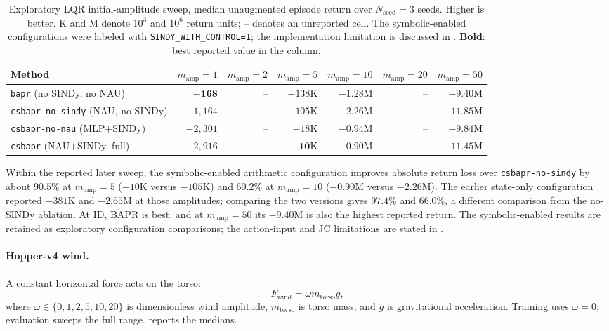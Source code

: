 \documentclass[10pt]{article}
\begin{document}
\begin{table}[htbp]
\centering
\scriptsize
\caption{Exploratory LQR initial-amplitude sweep, median unaugmented episode return over $N_{\mathrm{seed}}=3$ seeds. Higher is better. K and M denote $10^3$ and $10^6$ return units; -- denotes an unreported cell. The symbolic-enabled configurations were labeled with \texttt{SINDY\_WITH\_CONTROL=1}; the implementation limitation is discussed in . \textbf{Bold}: best reported value in the column.}
\label{tab:lqr}
\begin{tabular}{lrrrrrr}
\toprule
Method & $m_{\mathrm{amp}}{=}1$ & $m_{\mathrm{amp}}{=}2$ & $m_{\mathrm{amp}}{=}5$ & $m_{\mathrm{amp}}{=}10$ & $m_{\mathrm{amp}}{=}20$ & $m_{\mathrm{amp}}{=}50$ \\
\midrule
\texttt{bapr} (no SINDy, no NAU)         & $\mathbf{-168}$  & --      & $-138$K & $-1.28$M & --      & $\mathbf{-9.40}$M \\
\texttt{csbapr-no-sindy} (NAU, no SINDy) & $-1{,}164$  & --      & $-105$K & $-2.26$M & --      & $-11.85$M \\
\texttt{csbapr-no-nau} (MLP$+$SINDy)     & $-2{,}301$  & --      & $-18$K  & $-0.94$M & --      & $-9.84$M \\
\texttt{csbapr} (NAU$+$SINDy, full)      & $-2{,}916$  & --      & $\mathbf{-10}$K  & $\mathbf{-0.90}$M & --      & $-11.45$M \\
\bottomrule
\end{tabular}
\end{table}

Within the reported later sweep, the symbolic-enabled arithmetic configuration improves absolute return loss over \texttt{csbapr-no-sindy} by about $90.5\%$ at $m_{\mathrm{amp}}=5$ ($-10$K versus $-105$K) and $60.2\%$ at $m_{\mathrm{amp}}=10$ ($-0.90$M versus $-2.26$M). The earlier state-only configuration reported $-381$K and $-2.65$M at those amplitudes; comparing the two versions gives $97.4\%$ and $66.0\%$, a different comparison from the no-SINDy ablation. At ID, BAPR is best, and at $m_{\mathrm{amp}}=50$ its $-9.40$M is also the highest reported return. The symbolic-enabled results are retained as exploratory configuration comparisons; the action-input and JC limitations are stated in .

\paragraph{Hopper-v4 wind.}
A constant horizontal force acts on the torso:
\[
F_{\mathrm{wind}}=\omega m_{\mathrm{torso}}g,
\]
where $\omega\in\{0,1,2,5,10,20\}$ is dimensionless wind amplitude, $m_{\mathrm{torso}}$ is torso mass, and $g$ is gravitational acceleration. Training uses $\omega=0$; evaluation sweeps the full range.  reports the medians.
\end{document}
